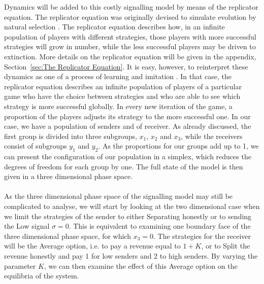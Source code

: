 \documentclass[a4paper,10pt]{article}
\numberwithin{equation}{section}
\begin{document}
Dynamics will be added to this costly signalling model by means of the replicator equation. The replicator equation was originally devised to simulate evolution by natural selection \cite{Taylor1978}. The replicator equation describes how, in an infinite population of players with different strategies, those players with more successful strategies will grow in number, while the less successful players may be driven to extinction. More details on the replicator equation will be given in the appendix, Section~\ref{sec:The Replicator Equation}. It is easy, however, to reinterpret these dynamics as one of a process of learning and imitation \cite{Vega-Redondo2003}. In that case, the replicator equation describes an infinite population of players of a particular game who have the choice between strategies and who are able to see which strategy is more successful globally. In every new iteration of the game, a proportion of the players adjusts its strategy to the more successful one. In our case, we have a population of senders and of receiver. As already discussed, the first group is divided into three subgroups, $x_1$, $x_2$ and $x_3$, while the receivers consist of subgroups $y_1$ and $y_2$. As the proportions for our groups add up to 1, we can present the configuration of our population in a simplex, which reduces the degrees of freedom for each group by one. The full state of the model is then given in a three dimensional phase space.\\
\\
As the three dimensional phase space of the signalling model may still be complicated to analyse, we will start by looking at the two dimensional case when we limit the strategies of the sender to either Separating honestly or to sending the Low signal $\sigma=0$. This is equivalent to examining one boundary face of the three dimensional phase space, for which $x_3=0$. The strategies for the receiver will be the Average option, i.e. to pay a revenue equal to $1+K$, or to Split the revenue honestly and pay 1 for low senders and 2 to high senders. By varying the parameter $K$, we can then examine the effect of this Average option on the equilibria of the system.
\end{document}
